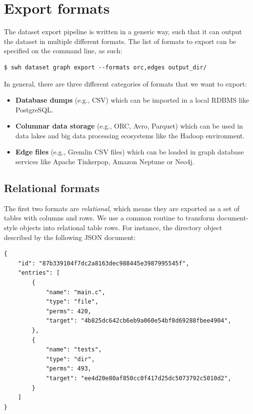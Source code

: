 \section{Export formats}

The dataset export pipeline is written in a generic way, such that it can
output the dataset in multiple different formats. The list of formats to export
can be specified on the command line, as such:

\begin{verbatim}
$ swh dataset graph export --formats orc,edges output_dir/
\end{verbatim}

In general, there are three different categories of formats that we want to
export:

\begin{itemize}
    \item \textbf{Database dumps} (e.g., CSV) which can be imported in a local
        \gls{RDBMS} like PostgreSQL.
    \item \textbf{Columnar data storage} (e.g., ORC, Avro, Parquet) which can
        be used in data lakes and big data processing ecosystems like the
        Hadoop environment.
    \item \textbf{Edge files} (e.g., Gremlin CSV files) which can
        be loaded in graph database services like Apache Tinkerpop, Amazon
        Neptune or Neo4j.
\end{itemize}

\subsection{Relational formats}
The first two formats are \emph{relational}, which means they are exported as a
set of tables with columns and rows. We use a common routine to transform
document-style objects into relational table rows. For instance, the directory
object described by the following JSON document:

{\footnotesize
\begin{verbatim}
{
    "id": "87b339104f7dc2a8163dec988445e3987995545f",
    "entries": [
        {
            "name": "main.c",
            "type": "file",
            "perms": 420,
            "target": "4b825dc642cb6eb9a060e54bf8d69288fbee4904",
        },
        {
            "name": "tests",
            "type": "dir",
            "perms": 493,
            "target": "ee4d20e80af850cc0f417d25dc5073792c5010d2",
        }
    ]
}
\end{verbatim}
}

